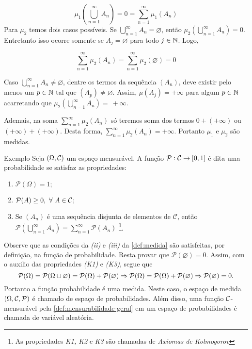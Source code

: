 $$\mu_1\left(\bigcup_{n = 1}^\infty A_n\right) = 0 = \sum_{n = 1}^\infty \mu_1(A_n) $$
Para $\mu_2$ temos dois casos possíveis.
Se  $\displaystyle \bigcup_{n = 1}^\infty A_n  = \varnothing$, então $\mu_2\left(\displaystyle \bigcup_{n = 1}^\infty A_n\right) = 0$. Entretanto isso ocorre somente se $A_j = \varnothing$ para todo $j \in \operatorname{\mathbb{N}}$.
Logo, 

$$\sum_{n = 1}^\infty \mu_2(A_n) = \sum_{n = 1}^\infty \mu_2(\varnothing) = 0$$

Caso $\displaystyle \bigcup_{n = 1}^\infty A_n  \neq  \varnothing$, dentre os termos da sequência $(A_n)$, deve existir pelo menos um $p \in \operatorname{\mathbb{N}}$ tal que $(A_p) \neq \varnothing$.
Assim, $\mu(A_j) = +\infty$ para algum $p \in \operatorname{\mathbb{N}}$ acarretando que  $\mu_2\left(\displaystyle \bigcup_{n = 1}^\infty A_n\right) =~+\infty$.

Ademais, na soma $\displaystyle \sum_{n = 1}^\infty \mu_2(A_n)$ só teremos soma dos termos $0 + (+ \infty)$ ou $(+\infty) + (+\infty)$.
Desta forma, $\displaystyle \sum_{n = 1}^\infty \mu_2(A_n) = +\infty$.
Portanto $\mu_1$ e $\mu_2$ são medidas.

\begin{env}{Exemplo}
	Seja $(\Omega, \operatorname{\mathcal{C}})$ um espaço mensurável.
	A função $\mathcal{P}:\operatorname{\mathcal{C}} \to [0,1]$ é dita uma probabilidade se satisfaz as propriedades:
	\begin{enumerate}[label* =(\textit{K\arabic*})]
		\item $\mathcal{P}(\Omega) = 1$;
		\item $\mathcal{P}(A) \geq 0,\ \forall\  A \in \operatorname{\mathcal{C}}$;
		\item Se $(A_n)$ é uma sequência disjunta de elementos de  $\mathcal{C}$, então 
		$\displaystyle\mathcal{P}\left(\bigcup_{n = 1}^\infty A_n\right) = \sum_{n = 1}^\infty\mathcal{P}(A_n)$
		\cite[p.11, adaptação nossa]{magalhaes}
		\footnote{As propriedades \textit{K1, K2} e \textit{K3} são chamadas de \textit{Axiomas de Kolmogorov}}.
	\end{enumerate}
\end{env}

Observe que as condições da \textit{(ii)} e \textit{(iii)} da \ref{def:medida} são satisfeitas, por definição, na função de probabilidade.
Resta provar que $\mathcal{P}(\varnothing) = 0$.
Assim, com o auxilio das propriedades \textit{(K1)} e \textit{(K3)}, segue que 
$$
\operatorname{\mathcal{P}}(\Omega)
= 
\operatorname{\mathcal{P}}(\Omega \cup \varnothing)
= 
\operatorname{\mathcal{P}}(\Omega) + \operatorname{\mathcal{P}}(\varnothing)
\Rightarrow
\operatorname{\mathcal{P}}(\Omega)
= 
\operatorname{\mathcal{P}}(\Omega) + \operatorname{\mathcal{P}}(\varnothing)
\Rightarrow
\operatorname{\mathcal{P}}(\varnothing) = 0.
$$
Portanto a função probabilidade é uma medida.
Neste caso, o espaço de medida $(\Omega, \operatorname{\mathcal{C}}, \operatorname{\mathcal{P}})$ é chamado de espaço de probabilidades.
Além disso, uma função $\operatorname{\mathcal{C}}$-mensurável pela \ref{def:mensurabilidade-geral} em um espaço de probabilidades é chamada de variável aleatória.

